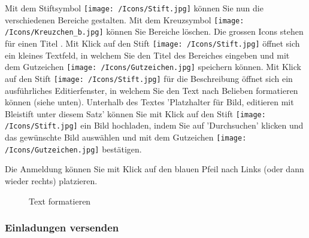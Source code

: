 Mit dem Stiftsymbol \texttt{[image: /Icons/Stift.jpg]} können Sie nun die verschiedenen Bereiche gestalten. Mit dem Kreuzsymbol \texttt{[image: /Icons/Kreuzchen\_b.jpg]} können Sie Bereiche löschen.
Die grossen Icons stehen für einen Titel . Mit Klick auf den Stift \texttt{[image: /Icons/Stift.jpg]} öffnet sich ein kleines Textfeld, in welchem Sie den Titel des Bereiches eingeben und mit dem Gutzeichen \texttt{[image: /Icons/Gutzeichen.jpg]} speichern können.
Mit Klick auf den Stift \texttt{[image: /Icons/Stift.jpg]} für die Beschreibung  öffnet sich ein ausführliches Editierfenster, in welchem Sie den Text nach Belieben formatieren können (siehe unten). Unterhalb des Textes 'Platzhalter für Bild, editieren mit Bleistift unter diesem Satz' können Sie mit Klick auf den Stift \texttt{[image: /Icons/Stift.jpg]} ein Bild hochladen, indem Sie auf 'Durchsuchen' klicken und das gewünschte Bild auswählen und mit dem Gutzeichen \texttt{[image: /Icons/Gutzeichen.jpg]} bestätigen. 

\vspace{\baselineskip}

Die Anmeldung  können Sie mit Klick auf den blauen Pfeil nach Links (oder dann wieder rechts) platzieren.

\begin{figure}[H]
\caption{Text formatieren}
\end{figure}

\subsubsection{Einladungen versenden}

